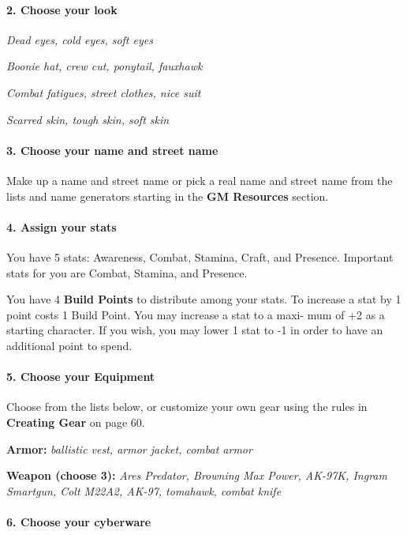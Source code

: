 \begin{multicols}{3}
\paragraph{2.  Choose your look}

\textit{Dead eyes, cold eyes, soft eyes}

\textit{Boonie hat, crew cut, ponytail, fauxhawk}

\textit{Combat fatigues, street clothes, nice suit}

\textit{Scarred skin, tough skin, soft skin}

\paragraph{3.  Choose your name and street name}

Make up a name and street name or pick a real
name and street name from the lists and name
generators starting in the \textbf{GM Resources} section.

\paragraph{4.  Assign your stats}

You have 5 stats: Awareness, Combat, Stamina,
Craft, and Presence. Important stats for you are
Combat, Stamina, and Presence.


You have 4 \textbf{Build Points} to distribute among
your stats. To increase a stat by 1 point costs 1
Build Point. You may increase a stat to a maxi-
mum of +2 as a starting character. If you wish,
you may lower 1 stat to -1 in order to have an
additional point to spend.

\paragraph{5.  Choose your Equipment}

Choose from the lists below, or customize your
own gear using the rules in \textbf{Creating Gear} on
page 60.

\textbf{Armor:} \textit{ballistic vest, armor jacket, combat
armor}

\textbf{Weapon (choose 3):} \textit{Ares Predator, Browning
Max Power, AK-97K, Ingram Smartgun, Colt
M22A2, AK-97, tomahawk, combat knife}


\paragraph{6.  Choose your cyberware}


\end{multicols}
